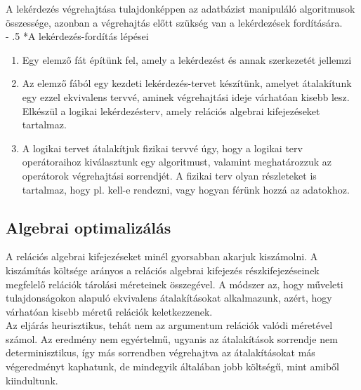 \documentclass[12pt,margin=0px]{article}
\makeatletter
\renewcommand\paragraph{%
	\@startsection{paragraph}{4}{0mm}%
	{-\baselineskip}%
	{.5\baselineskip}%
	{\normalfont\normalsize\bfseries}}
\makeatother
\begin{document}
	\noindent A lekérdezés végrehajtása tulajdonképpen az adatbázist manipuláló algoritmusok összessége, azonban a végrehajtás előtt szükség van a lekérdezések fordítására.\\
	
	\paragraph*{A lekérdezés-fordítás lépései}
	\begin{enumerate}
		\item	Egy elemző fát építünk fel, amely a lekérdezést és annak szerkezetét jellemzi
		
		\item	Az elemző fából egy kezdeti lekérdezés-tervet készítünk, amelyet átalakítunk
		egy ezzel ekvivalens tervvé, aminek végrehajtási ideje várhatóan kisebb lesz. Elkészül a logikai
		lekérdezésterv, amely relációs algebrai kifejezéseket tartalmaz.
		
		\item	A logikai tervet átalakítjuk fizikai tervvé úgy, hogy a logikai terv operátoraihoz kiválasztunk egy
		algoritmust,  valamint meghatározzuk az operátorok végrehajtási sorrendjét. A fizikai terv olyan részleteket is
		tartalmaz, hogy pl. kell-e rendezni, vagy hogyan férünk hozzá az adatokhoz.
	\end{enumerate}

	\subsection*{Algebrai optimalizálás}
	
    A relációs algebrai kifejezéseket minél gyorsabban akarjuk kiszámolni. A kiszámítás költsége arányos a relációs algebrai kifejezés részkifejezéseinek megfelelő relációk tárolási méreteinek összegével. A módszer az, hogy műveleti tulajdonságokon alapuló ekvivalens átalakításokat alkalmazunk, azért, hogy várhatóan kisebb méretű relációk keletkezzenek.\\

    \noindent Az eljárás heurisztikus, tehát nem az argumentum relációk valódi méretével számol. Az eredmény nem egyértelmű, ugyanis az átalakítások sorrendje nem determinisztikus, így más sorrendben végrehajtva az átalakításokat más végeredményt kaphatunk, de mindegyik általában jobb költségű, mint amiből kiindultunk.\\
	
\end{document}

